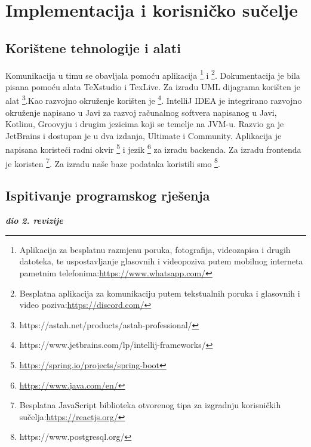 \chapter{Implementacija i korisničko sučelje}
		
		
		\section{Korištene tehnologije i alati}
		
			
			 {Komunikacija u timu se obavljala pomoću aplikacija \footnote{Aplikacija za besplatnu razmjenu poruka, fotografija, videozapisa i drugih datoteka, te uspostavljanje glasovnih i videopoziva putem mobilnog interneta pametnim telefonima:\newline\url{https://www.whatsapp.com/}} i \footnote{Besplatna aplikacija za komunikaciju putem tekstualnih poruka i glasovnih i video poziva:\newline\url{https://discord.com/}}.
			 	\newline Dokumentacija je bila pisana pomoću alata TeXstudio i TexLive. Za izradu UML dijagrama korišten je alat \footnote{https://astah.net/products/astah-professional/}.Kao razvojno okruženje korišten je \footnote{https://www.jetbrains.com/lp/intellij-frameworks/}. IntelliJ IDEA je integrirano razvojno okruženje napisano u Javi za razvoj računalnog softvera napisanog u Javi, Kotlinu, Groovyju i drugim jezicima koji se temelje na JVM-u. Razvio ga je JetBrains i dostupan je u dva izdanja, Ultimate i Community. Aplikacija je napisana koristeći radni okvir \footnote{\url{https://spring.io/projects/spring-boot}} i jezik \footnote{\url{https://www.java.com/en/}} za izradu backenda. Za izradu frontenda je koristen \footnote{Besplatna JavaScript biblioteka otvorenog tipa za izgradnju korisničkih sučelja:\newline\url{https://reactjs.org/}}. Za izradu naše baze podataka koristili smo \footnote{https://www.postgresql.org/}.}
			
			
			\eject 
		
	
		\section{Ispitivanje programskog rješenja}
			
			\textbf{\textit{dio 2. revizije}}\\
			
